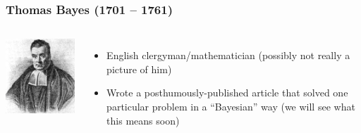 \documentclass{beamer}
\begin{document}
\begin{frame}
\frametitle{Thomas Bayes (1701 -- 1761)}

    \begin{columns} %
        \includegraphics[width=1\linewidth]{images/bayes.jpg}

        \begin{itemize}
        \item English clergyman/mathematician (possibly not really a picture of him)\pause
        \item Wrote a posthumously-published article that solved one particular problem in a ``Bayesian'' way
                (we will see what this means soon)
        \end{itemize}
     \end{columns}

\end{frame}
\end{document}
